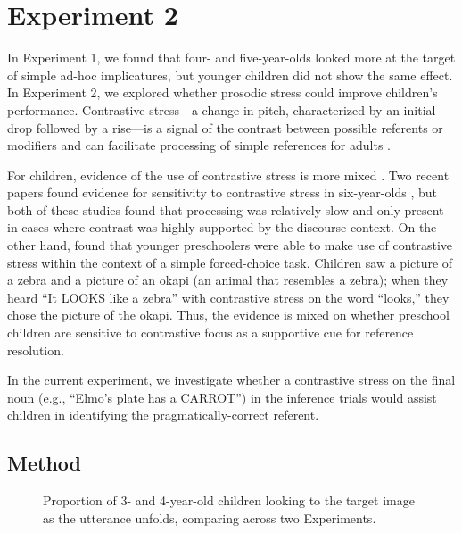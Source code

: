 \documentclass[10pt,letterpaper]{article}
\begin{document}
\section{Experiment 2}

In Experiment 1, we found that four- and five-year-olds looked more at the target of simple ad-hoc implicatures, but younger children did not show the same effect. In Experiment 2, we explored whether prosodic stress could improve children's performance. Contrastive stress---a change in pitch, characterized by an initial drop followed by a rise---is a signal of the contrast between possible referents or modifiers and can facilitate processing of simple references for adults \cite{ito2008anticipatory}.

For children, evidence of the use of contrastive stress is more mixed \cite{cutler1987}. Two recent papers found evidence for sensitivity to contrastive stress in six-year-olds \cite{sekerina2012,ito2012}, but both of these studies found that processing was relatively slow and only present in cases where contrast was highly supported by the discourse context. On the other hand,  found that younger preschoolers were able to make use of contrastive stress within the context of a simple forced-choice task. Children saw a picture of a zebra and a picture of an okapi (an animal that resembles a zebra); when they heard ``It LOOKS like a zebra'' with contrastive stress on the word ``looks,'' they chose the picture of the okapi. Thus, the evidence is mixed on whether preschool children are sensitive to contrastive focus as a supportive cue for reference resolution. 

In the current experiment, we investigate whether a contrastive stress on the final noun (e.g., ``Elmo's plate has a CARROT'') in the inference trials would assist children in identifying the pragmatically-correct referent.

\subsection{Method}


\begin{figure}[t]
	\caption{\label{fig:pros0} Proportion of 3- and 4-year-old children looking to the target image as the utterance unfolds, comparing across two Experiments.}
\end{figure}
\end{document}
